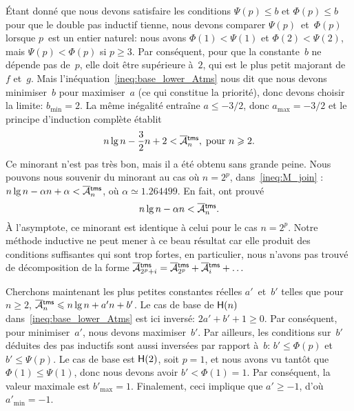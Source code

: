 Étant donné que nous devons satisfaire les conditions \(\Psi(p)
\leqslant b\) et \(\Phi(p) \leqslant b\) pour que le double pas
inductif tienne, nous devons comparer \(\Psi(p)\)~et~\(\Phi(p)\)
lorsque \(p\)~est un entier naturel: nous avons \(\Phi(1) < \Psi(1)\)
et \(\Phi(2) < \Psi(2)\), mais \(\Psi(p) < \Phi(p)\) si \(p \geqslant
3\). Par conséquent, pour que la constante~\(b\) ne dépende pas
de~\(p\), elle doit être supérieure à~\(2\), qui est le plus petit
majorant de~\(f\) et~\(g\).  Mais
l'inéquation~\eqref{ineq:base_lower_Atms} nous dit que nous devons
minimiser~\(b\) pour maximiser~\(a\) (ce qui constitue la priorité),
donc devons choisir la limite: \(b_{\min} = 2\). La même inégalité
entraîne \(a \leqslant -3/2\), donc \(a_{\max} = -3/2\) et le principe
d'induction complète établit
\begin{equation}
  n\lg n - \frac{3}{2} n + 2 < \OM{\fun{tms}}{n},\; \text{pour \(n
    \geqslant 2\)}.
\label{ineq:lower_Atms}
\end{equation}
Ce minorant n'est pas très bon, mais il a été obtenu sans grande
peine. Nous pouvons nous souvenir du minorant au cas où \(n=2^p\),
dans~\eqref{ineq:M_join} : \(n\lg n - \alpha n +
\alpha < \OM{\fun{tms}}{n}\), où \(\alpha \simeq 1.264499\). En fait,
\cite{FlajoletGolin_1994} ont prouvé
\begin{equation}
n\lg n - \alpha n < \OM{\fun{tms}}{n}.
\label{ineq:best_lower_Atms}
\end{equation}
À l'asymptote, ce minorant est identique à celui pour le cas
\(n=2^p\). Notre méthode inductive ne peut mener à ce beau résultat
car elle produit des conditions suffisantes qui sont trop fortes, en
particulier, nous n'avons pas trouvé de décomposition de la forme
\(\OM{\fun{tms}}{2^p+i} = \OM{\fun{tms}}{2^p} + \OM{\fun{tms}}{i} +
\dots\)

Cherchons maintenant les plus petites constantes réelles
\(a'\)~et~\(b'\) telles que pour \(n \geqslant 2\),
\(\OM{\fun{tms}}{n} \leqslant n\lg n + a'n + b'\). Le cas de base de
\(\textsf{H}({n})\) dans~\eqref{ineq:base_lower_Atms} est ici inversé:
\(2a' + b' + 1 \geqslant 0\). Par conséquent, pour minimiser~\(a'\),
nous devons maximiser~\(b'\). Par ailleurs, les conditions sur~\(b'\)
déduites des pas inductifs sont aussi inversées par rapport à~\(b\):
\(b' \leqslant \Phi(p)\) et \(b' \leqslant \Psi(p)\). Le cas de base
est \(\textsf{H}({2})\), soit \(p=1\), et nous avons vu tantôt que
\(\Phi(1) \leqslant \Psi(1)\), donc nous devons avoir \(b'< \Phi(1) =
1\). Par conséquent, la valeur maximale est \(b'_{\max} =
1\). Finalement, ceci implique que \(a'\geqslant -1\), d'où
\(a'_{\min} = -1\).

